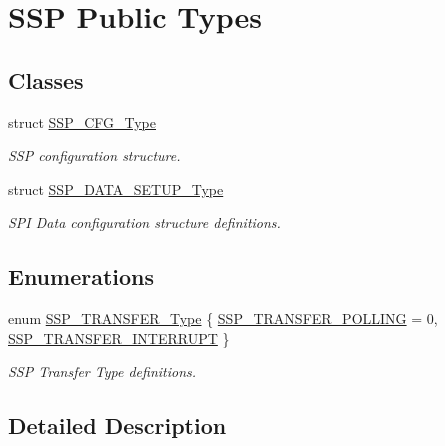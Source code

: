 \hypertarget{group___s_s_p___public___types}{}\section{S\+SP Public Types}
\label{group___s_s_p___public___types}
\subsection*{Classes}
\begin{DoxyCompactItemize}
\item 
struct \hyperlink{struct_s_s_p___c_f_g___type}{S\+S\+P\+\_\+\+C\+F\+G\+\_\+\+Type}
\begin{DoxyCompactList}\small\item\em S\+SP configuration structure. \end{DoxyCompactList}\item 
struct \hyperlink{struct_s_s_p___d_a_t_a___s_e_t_u_p___type}{S\+S\+P\+\_\+\+D\+A\+T\+A\+\_\+\+S\+E\+T\+U\+P\+\_\+\+Type}
\begin{DoxyCompactList}\small\item\em S\+PI Data configuration structure definitions. \end{DoxyCompactList}\end{DoxyCompactItemize}
\subsection*{Enumerations}
\begin{DoxyCompactItemize}
\item 
enum \hyperlink{group___s_s_p___public___types_ga34f9cea91f43d14807778072c5f3c20f}{S\+S\+P\+\_\+\+T\+R\+A\+N\+S\+F\+E\+R\+\_\+\+Type} \{ \hyperlink{group___s_s_p___public___types_gga34f9cea91f43d14807778072c5f3c20facbf9f348aff60d888fc8d156c57dd17e}{S\+S\+P\+\_\+\+T\+R\+A\+N\+S\+F\+E\+R\+\_\+\+P\+O\+L\+L\+I\+NG} = 0, 
\hyperlink{group___s_s_p___public___types_gga34f9cea91f43d14807778072c5f3c20fad400016c53e56670b957e0b09638c7a2}{S\+S\+P\+\_\+\+T\+R\+A\+N\+S\+F\+E\+R\+\_\+\+I\+N\+T\+E\+R\+R\+U\+PT}
 \}\begin{DoxyCompactList}\small\item\em S\+SP Transfer Type definitions. \end{DoxyCompactList}
\end{DoxyCompactItemize}


\subsection{Detailed Description}


